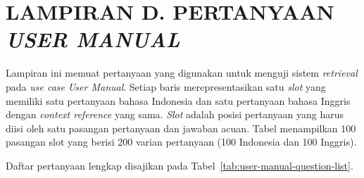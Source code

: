 \clearpage
\chapter*{LAMPIRAN D. PERTANYAAN \emph{USER MANUAL}}

Lampiran ini memuat pertanyaan yang digunakan untuk menguji sistem \emph{retrieval} pada
\emph{use case} \emph{User Manual}. Setiap baris merepresentasikan satu \emph{slot} yang
memiliki satu pertanyaan bahasa Indonesia dan satu pertanyaan bahasa Inggris dengan
\emph{context reference} yang sama. \emph{Slot} adalah posisi pertanyaan yang harus diisi
oleh satu pasangan pertanyaan dan jawaban acuan. Tabel menampilkan 100 pasangan slot yang berisi 200 varian pertanyaan
(100 Indonesia dan 100 Inggris).

\noindent Daftar pertanyaan lengkap disajikan pada Tabel~\ref{tab:user-manual-question-list}.

